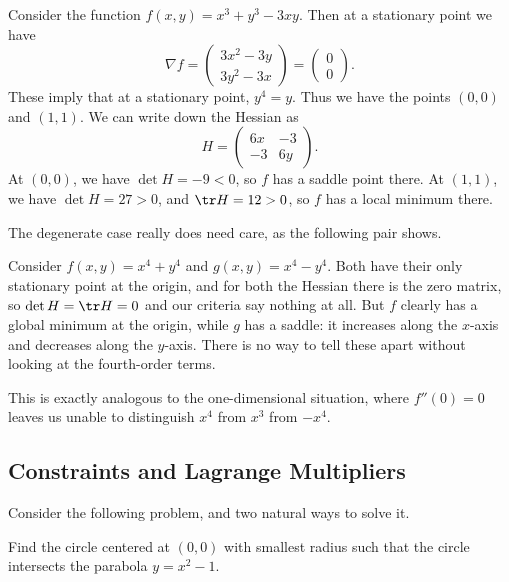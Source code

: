 \documentclass[a4paper]{scrartcl}
\begin{document}
\begin{example}
	Consider the function $f(x, y) = x^3 + y^3 - 3xy$. Then at a stationary point we have
	$$
\nabla f = \begin{pmatrix}
	3x^2 - 3y \\
	3y^2 - 3x
\end{pmatrix} = \begin{pmatrix}
	0 \\ 0
\end{pmatrix}.
	$$
	These imply that at a stationary point, $y^4 = y$. Thus we have the points $(0, 0)$ and $(1, 1)$. We can write down the Hessian as
	$$
	H = \begin{pmatrix}
		6x & -3 \\ -3 & 6y
	\end{pmatrix}.
	$$
	At $(0, 0)$, we have $\det H = -9 < 0$, so $f$ has a saddle point there. At $(1, 1)$, we have $\det H = 27 > 0$, and $\tr H = 12 > 0$, so $f$ has a local minimum there.
\end{example}

The degenerate case really does need care, as the following pair shows.

\begin{example}
	Consider $f(x, y) = x^4 + y^4$ and $g(x, y) = x^4 - y^4$. Both have their only stationary point at the origin, and for both the Hessian there is the zero matrix, so $\det H = \tr H = 0$ and our criteria say nothing at all. But $f$ clearly has a global minimum at the origin, while $g$ has a saddle: it increases along the $x$-axis and decreases along the $y$-axis. There is no way to tell these apart without looking at the fourth-order terms.

	This is exactly analogous to the one-dimensional situation, where $f''(0) = 0$ leaves us unable to distinguish $x^4$ from $x^3$ from $-x^4$.
\end{example}

\subsection{Constraints and Lagrange Multipliers}\label{sec:lm}

Consider the following problem, and two natural ways to solve it.

\begin{example}
	Find the circle centered at $(0, 0)$ with smallest radius such that the circle intersects the parabola $y = x^2 - 1$.
\end{example}
\end{document}
